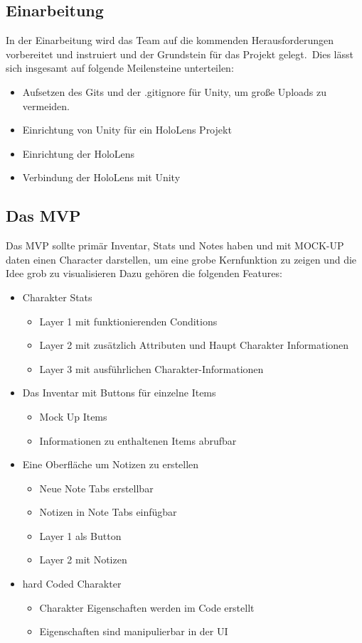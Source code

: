 \subsection{Einarbeitung}\label{subsec:getting_started}
In der Einarbeitung wird das Team auf die kommenden Herausforderungen vorbereitet und instruiert und der Grundstein
für das Projekt gelegt.\ Dies lässt sich insgesamt auf folgende Meilensteine unterteilen:
\begin{itemize}
    \item Aufsetzen des Gits und der .gitignore für Unity, um große Uploads zu vermeiden.
    \item Einrichtung von Unity für ein HoloLens Projekt
    \item Einrichtung der HoloLens
    \item Verbindung der HoloLens mit Unity
\end{itemize}


\subsection{Das MVP}\label{subsec:mvp}
Das MVP sollte primär Inventar, Stats und Notes haben und mit MOCK-UP daten einen Character darstellen, um eine grobe
Kernfunktion zu zeigen und die Idee grob zu visualisieren
Dazu gehören die folgenden Features:
\begin{itemize}
    \item Charakter Stats
    \begin{itemize}
        \item Layer 1 mit funktionierenden Conditions
        \item Layer 2 mit zusätzlich Attributen und Haupt Charakter Informationen
        \item Layer 3 mit ausführlichen Charakter-Informationen
    \end{itemize}
    \item Das Inventar mit Buttons für einzelne Items
    \begin{itemize}
        \item Mock Up Items
        \item Informationen zu enthaltenen Items abrufbar
    \end{itemize}
    \item Eine Oberfläche um Notizen zu erstellen
    \begin{itemize}
        \item Neue Note Tabs erstellbar
        \item Notizen in Note Tabs einfügbar
        \item Layer 1 als Button
        \item Layer 2 mit Notizen
    \end{itemize}
    \item hard Coded Charakter
    \begin{itemize}
        \item Charakter Eigenschaften werden im Code erstellt
        \item Eigenschaften sind manipulierbar in der UI
    \end{itemize}
\end{itemize}


